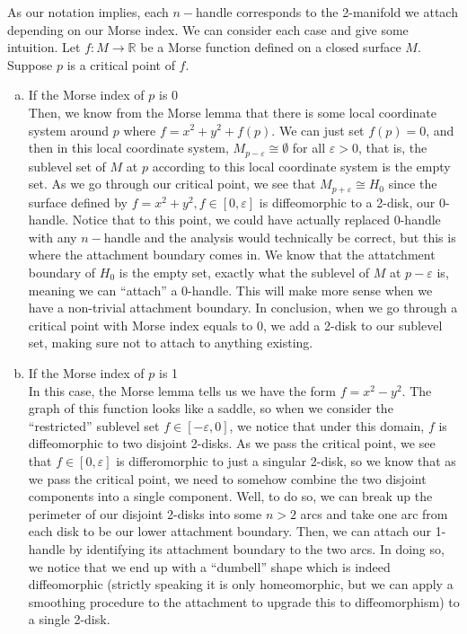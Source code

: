 \documentclass[12pt]{article}
\newcommand{\bR}{{\mathbb R}}
\theoremstyle{definition}
\begin{document}
	As our notation implies, each $n-$handle corresponds to the 2-manifold we attach depending on our Morse index. We can consider each case and give some intuition. Let $f:M\rightarrow \bR$ be a Morse function defined on a closed surface $M$. Suppose $p$ is a critical point of $f$. 
	\begin{enumerate}[(a)]
		\item If the Morse index of $p$ is 0 \\
		Then, we know from the Morse lemma that there is some local coordinate system around $p$ where $f = x^2 + y^2 +f(p)$. We can just set $f(p)=0$, and then in this local coordinate system, $M_{p-\varepsilon} \cong \emptyset$ for all $\varepsilon > 0$, that is, the sublevel set of $M$ at $p$ according to this local coordinate system is the empty set. As we go through our critical point, we see that $M_{p+\varepsilon} \cong H_0$ since the surface defined by $f=x^2+y^2, f\in[0,\varepsilon]$ is diffeomorphic to a 2-disk, our 0-handle. Notice that to this point, we could have actually replaced 0-handle with any $n-$handle and the analysis would technically be correct, but this is where the attachment boundary comes in. We know that the attatchment boundary of $H_0$ is the empty set, exactly what the sublevel of $M$ at $p-\varepsilon$ is, meaning we can ``attach'' a 0-handle. This will make more sense when we have a non-trivial attachment boundary. In conclusion, when we go through a critical point with Morse index equals to 0, we add a 2-disk to our sublevel set, making sure not to attach to anything existing. 
		\item If the Morse index of $p$ is 1\\
		In this case, the Morse lemma tells us we have the form $f = x^2 - y^2$. The graph of this function looks like a saddle, so when we consider the ``restricted'' sublevel set $f \in [-\varepsilon, 0]$, we notice that under this domain, $f$ is diffeomorphic to two disjoint 2-disks. As we pass the critical point, we see that $f \in [0,\varepsilon]$ is differomorphic to just a singular 2-disk, so we know that as we pass the critical point, we need to somehow combine the two disjoint components into a single component. Well, to do so, we can break up the perimeter of our disjoint 2-disks into some $n>2$ arcs and take one arc from each disk to be our lower attachment boundary. Then, we can attach our 1-handle by identifying its attachment boundary to the two arcs. In doing so, we notice that we end up with a ``dumbell'' shape which is indeed diffeomorphic (strictly speaking it is only homeomorphic, but we can apply a smoothing procedure to the attachment to upgrade this to diffeomorphism) to a single 2-disk. 

\end{enumerate}
\end{document}
